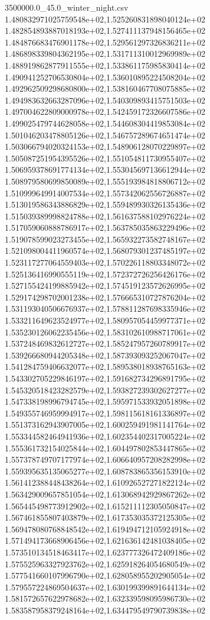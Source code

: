 \begin{filecontents*}{3500000.0_45.0_winter_night.csv}
1.480832971025759548e+02,1.525260831898040124e+02
1.482854893887018193e+02,1.527411137948156465e+02
1.484876683476901178e+02,1.529561297326836211e+02
1.486898339804362195e+02,1.531711310012969989e+02
1.488919862877911555e+02,1.533861175985830414e+02
1.490941252706530804e+02,1.536010895224508204e+02
1.492962509298680800e+02,1.538160467708075885e+02
1.494983632663287096e+02,1.540309893415751503e+02
1.497004622809000978e+02,1.542459172326607586e+02
1.499025479744628058e+02,1.544608304419853084e+02
1.501046203478805126e+02,1.546757289674651474e+02
1.503066794020324153e+02,1.548906128070229897e+02
1.505087251954395526e+02,1.551054811730955407e+02
1.506959378691774134e+02,1.553045697136612944e+02
1.508979580699850089e+02,1.555193984818806712e+02
1.510999649914007534e+02,1.557342062556726887e+02
1.513019586343886829e+02,1.559489930326135436e+02
1.515039389998824788e+02,1.561637588102976224e+02
1.517059060888786917e+02,1.563785035863229496e+02
1.519078599023273455e+02,1.565932273582748167e+02
1.521098004411960574e+02,1.568079301237485197e+02
1.523117277064559403e+02,1.570226118803348072e+02
1.525136416990555119e+02,1.572372726256426176e+02
1.527155424199885942e+02,1.574519123572626995e+02
1.529174298702001238e+02,1.576665310727876204e+02
1.531193040506676937e+02,1.578811287698335946e+02
1.533211649623524977e+02,1.580957054459977371e+02
1.535230126062235456e+02,1.583102610988717061e+02
1.537248469832612727e+02,1.585247957260789917e+02
1.539266680944205348e+02,1.587393093252067047e+02
1.541284759406632077e+02,1.589538018938765163e+02
1.543302705229846197e+02,1.591682734296891795e+02
1.545320518423282579e+02,1.593827239302627277e+02
1.547338198996794745e+02,1.595971533932051898e+02
1.549355746959994917e+02,1.598115618161336897e+02
1.551373162943907005e+02,1.600259491981141764e+02
1.553344582464941936e+02,1.602354402317005224e+02
1.555361732154025844e+02,1.604497802853447865e+02
1.557378749707177974e+02,1.606640957208282998e+02
1.559395635135065277e+02,1.608783865356153910e+02
1.561412388448438264e+02,1.610926527271822124e+02
1.563429009657851054e+02,1.613068942929867262e+02
1.565445498773912902e+02,1.615211112305050847e+02
1.567461855807403879e+02,1.617353035372125305e+02
1.569478080768848542e+02,1.619494712105924918e+02
1.571494173668906456e+02,1.621636142481038405e+02
1.573510134518463417e+02,1.623777326472409186e+02
1.575525963327923762e+02,1.625918264054680549e+02
1.577541660107996790e+02,1.628058955202905054e+02
1.579557224869504637e+02,1.630199399891644134e+02
1.581572657622978682e+02,1.632339598095986730e+02
1.583587958379248164e+02,1.634479549790739838e+02

\end{filecontents*}
